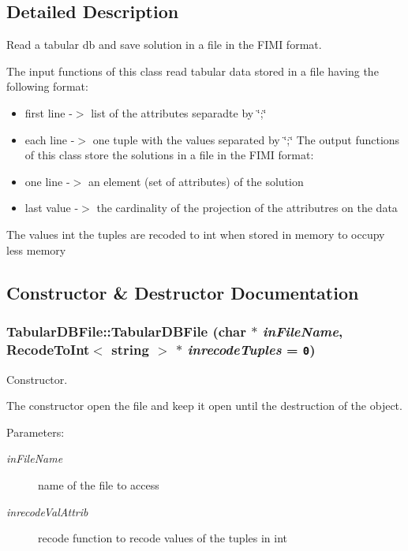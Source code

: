 \subsection{Detailed Description}
Read a tabular db and save solution in a file in the FIMI format. 

The input functions of this class read tabular data stored in a file having the following format:\begin{itemize}
\item first line -$>$ list of the attributes separadte by \char`\"{};\char`\"{}\item each line -$>$ one tuple with the values separated by \char`\"{};\char`\"{} The output functions of this class store the solutions in a file in the FIMI format:\item one line -$>$ an element (set of attributes) of the solution\item last value -$>$ the cardinality of the projection of the attributres on the data\end{itemize}


The values int the tuples are recoded to int when stored in memory to occupy less memory 



\subsection{Constructor \& Destructor Documentation}
\subsubsection{\setlength{\rightskip}{0pt plus 5cm}Tabular\-DBFile::Tabular\-DBFile (char $\ast$ {\em in\-File\-Name}, {\bf Recode\-To\-Int}$<$ string $>$ $\ast$ {\em inrecode\-Tuples} = {\tt 0})\hspace{0.3cm}{\tt  [inline]}}\label{class_tabular_d_b_file_9dc7164b66cb23bcbf55647d4469e21d}


Constructor. 

The constructor open the file and keep it open until the destruction of the object.

\begin{Desc}
\item[Parameters:]
\begin{description}
\item[{\em in\-File\-Name}]name of the file to access \item[{\em inrecode\-Val\-Attrib}]recode function to recode values of the tuples in int \end{description}
\end{Desc}
